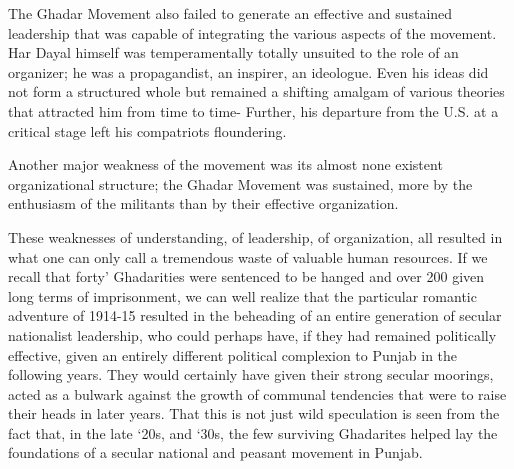 The Ghadar Movement also failed to generate an effective and sustained leadership that was capable of integrating the various aspects of the movement. Har Dayal himself was temperamentally totally unsuited to the role of an organizer; he was a propagandist, an inspirer, an ideologue. Even his ideas did not form a structured whole but remained a shifting amalgam of various theories that attracted him from time to time- Further, his departure from the U.S. at a critical stage left his compatriots floundering.

Another major weakness of the movement was its almost none existent organizational structure; the Ghadar Movement was sustained, more by the enthusiasm of the militants than by their effective organization.

These weaknesses of understanding, of leadership, of organization, all resulted in what one can only call a tremendous waste of valuable human resources. If we recall that forty’ Ghadarities were sentenced to be hanged and over 200 given long terms of imprisonment, we can well realize that the particular romantic adventure of 1914-15 resulted in the beheading of an entire generation of secular nationalist leadership, who could perhaps have, if they had remained politically effective, given an entirely different political complexion to Punjab in the following years. They would certainly have given their strong secular moorings, acted as a bulwark against the growth of communal tendencies that were to raise their heads in later years. That this is not just wild speculation is seen from the fact that, in the late ‘20s, and ‘30s, the few surviving Ghadarites helped lay the foundations of a secular national and peasant movement in Punjab.

